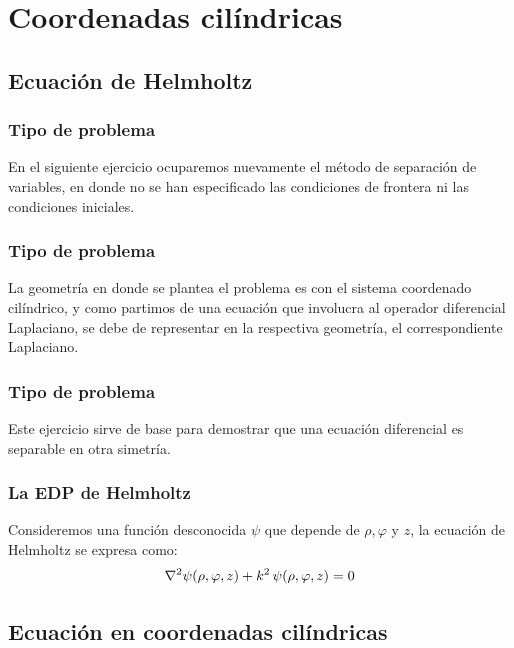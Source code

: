 \documentclass[12pt]{beamer}
\begin{document}
\section{Coordenadas cilíndricas}
\subsection{Ecuación de Helmholtz}

\begin{frame}
\frametitle{Tipo de problema}
En el siguiente ejercicio ocuparemos nuevamente el método de separación de variables, en donde no se han especificado las condiciones de frontera ni las condiciones iniciales.
\end{frame}
\begin{frame}
\frametitle{Tipo de problema}
La geometría en donde se plantea el problema es con el sistema coordenado cilíndrico, y como partimos de una ecuación que involucra al operador diferencial Laplaciano, se debe de representar en la respectiva geometría, el correspondiente Laplaciano.
\end{frame}
\begin{frame}
\frametitle{Tipo de problema}
Este ejercicio sirve de base para demostrar que una ecuación diferencial es separable en otra simetría.
\end{frame}
\begin{frame}
\frametitle{La EDP de Helmholtz}
Consideremos una función desconocida $\psi$ que depende de $\rho, \varphi$ y $z$, la ecuación de Helmholtz se expresa como:
\pause
\begin{align}
\laplacian{\psi (\rho, \varphi, z)} + k^{2} \, \psi (\rho, \varphi, z) = 0
\label{eq:ecuacion_09_45}    
\end{align}
\end{frame}

\subsection{Ecuación en coordenadas cilíndricas}
\end{document}
